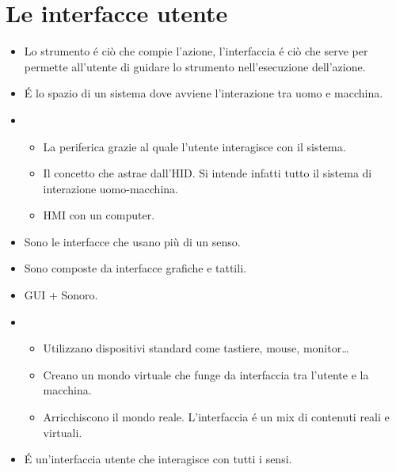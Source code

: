 \chapter{Le interfacce utente}

\begin{itemize}
    \item Lo strumento \'e ci\`o che compie l'azione, l'interfaccia \'e ci\`o che serve per permette all'utente di guidare lo strumento nell'esecuzione dell'azione.
    \item {} \'E lo spazio di un sistema dove avviene l'interazione tra uomo e macchina.
    \item {}
    \begin{itemize}
        \item {} La periferica grazie al quale l'utente interagisce con il sistema.
        \item {} Il concetto che astrae dall'HID. Si intende infatti tutto il sistema di interazione uomo-macchina.
        \item {} HMI con un computer.
    \end{itemize}
    \item {} Sono le interfacce che usano pi\`u di un senso.
    \item {} Sono composte da interfacce grafiche e tattili.
    \item {} GUI + Sonoro.
    \item {}
    \begin{itemize}
        \item {} Utilizzano dispositivi standard come tastiere, mouse, monitor\dots
        \item {} Creano un mondo virtuale che funge da interfaccia tra l'utente e la macchina.
        \item {} Arricchiscono il mondo reale. L'interfaccia \'e un mix di contenuti reali e virtuali.
    \end{itemize}
    \item {} \'E un'interfaccia utente che interagisce con tutti i sensi.
\end{itemize}